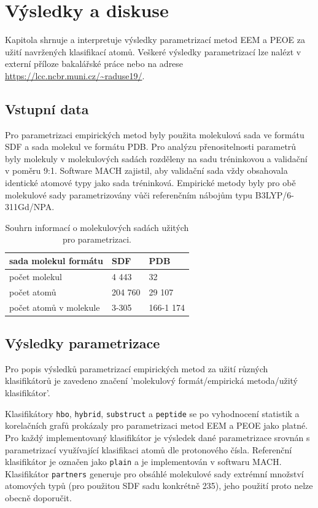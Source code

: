 \chapter{Výsledky a diskuse}
Kapitola shrnuje a interpretuje výsledky parametrizací metod EEM a PEOE za užití navržených klasifikací atomů. 
Veškeré výsledky parametrizací lze nalézt v externí příloze bakalářské práce nebo na adrese \url{https://lcc.ncbr.muni.cz/~raduse19/}.

\section{Vstupní data}
Pro parametrizaci empirických metod byly použita molekulová sada ve formátu SDF a sada molekul ve formátu PDB. Pro analýzu přenositelnosti parametrů byly molekuly v molekulových sadách rozděleny na sadu tréninkovou a validační v poměru 9:1. Software MACH zajistil, aby validační sada vždy obsahovala identické atomové typy jako sada tréninková. Empirické metody byly pro obě molekulové sady parametrizovány vůči referenčním nábojům typu B3LYP/6-311Gd/NPA.
\begin{table}[h]
    \centering
    \begin{tabular}{l|l|l}
         sada molekul formátu &  SDF & PDB\\
         \hline
         počet molekul & 4 443 & 32\\   
         počet atomů & 204 760 & 29 107\\
         počet atomů v molekule & 3-305 & 166-1 174 
    \end{tabular}
    \caption{Souhrn informací o molekulových sadách užitých pro parametrizaci.}
    \label{moleculesets}
\end{table}

\section{Výsledky parametrizace}
Pro popis výsledků parametrizací empirických metod za užití různých klasifikátorů je zavedeno značení 'molekulový  formát/empirická metoda/užitý klasifikátor'.

Klasifikátory \verb|hbo|, \verb|hybrid|, \verb|substruct| a \verb|peptide| se po vyhodnocení statistik a korelačních grafů prokázaly pro parametrizaci metod EEM a PEOE jako platné. 
Pro každý implementovaný klasifikátor je výsledek dané parametrizace srovnán s parametrizací využívající klasifikaci atomů dle protonového čísla. Referenční klasifikátor je označen jako \verb|plain| a je implementován v softwaru MACH. Klasifikátor \verb|partners| generuje pro obsáhlé molekulové sady extrémní množství atomových typů (pro použitou SDF sadu konkrétně 235), jeho použití proto nelze obecně doporučit. 


